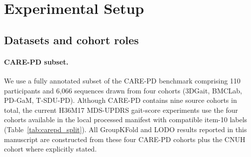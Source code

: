 \documentclass[preprint,12pt]{elsarticle}
\begin{document}
\section{Experimental Setup}
\label{sec:setup}

\subsection{Datasets and cohort roles}
\label{sec:datasets}
\paragraph{CARE-PD subset.}
We use a fully annotated subset of the CARE-PD benchmark
\cite{adeli2025carepd} comprising 110 participants and 6{,}066 sequences drawn
from four cohorts (3DGait, BMCLab, PD-GaM, T-SDU-PD).
Although CARE-PD contains nine source cohorts in total, the current H36M17
MDS-UPDRS gait-score experiments use the four cohorts available in the local
processed manifest with compatible item-10 labels (Table~\ref{tab:carepd_split}).
All GroupKFold and LODO results reported in this manuscript are constructed
from these four CARE-PD cohorts plus the CNUH cohort where explicitly stated.

\begin{table}[htpb]
\centering
\caption{CARE-PD cohorts included in the processed H36M17 item-10 manifest.
All four cohorts are included in GroupKFold and CARE-PD LODO experiments.}
\label{tab:carepd_split}
\end{table}
\end{document}
